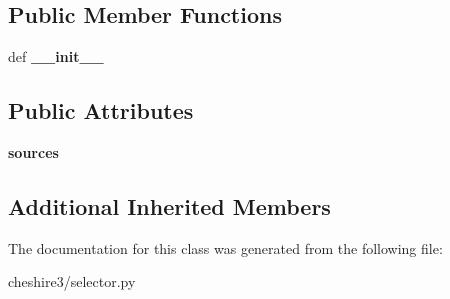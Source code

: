 \subsection*{Public Member Functions}
\begin{DoxyCompactItemize}
\item 
\hypertarget{classcheshire3_1_1selector_1_1_simple_selector_a29349b59bcf34fc3f34689e3e904cfb5}{def {\bfseries \-\_\-\-\_\-init\-\_\-\-\_\-}}\label{classcheshire3_1_1selector_1_1_simple_selector_a29349b59bcf34fc3f34689e3e904cfb5}

\end{DoxyCompactItemize}
\subsection*{Public Attributes}
\begin{DoxyCompactItemize}
\item 
\hypertarget{classcheshire3_1_1selector_1_1_simple_selector_abd57a57400a9900c2aa3dff7c61b730f}{{\bfseries sources}}\label{classcheshire3_1_1selector_1_1_simple_selector_abd57a57400a9900c2aa3dff7c61b730f}

\end{DoxyCompactItemize}
\subsection*{Additional Inherited Members}


The documentation for this class was generated from the following file\-:\begin{DoxyCompactItemize}
\item 
cheshire3/selector.\-py\end{DoxyCompactItemize}
